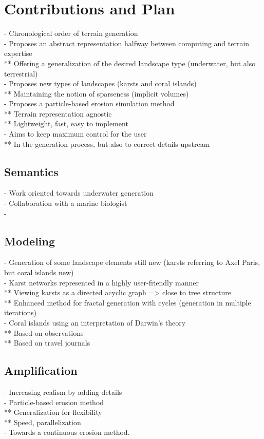 \section{Contributions and Plan}
\label{sec:introduction_contribution-plan}
- Chronological order of terrain generation \\
- Proposes an abstract representation halfway between computing and terrain expertise \\
** Offering a generalization of the desired landscape type (underwater, but also terrestrial) \\
- Proposes new types of landscapes (karsts and coral islands) \\
** Maintaining the notion of sparseness (implicit volumes) \\
- Proposes a particle-based erosion simulation method \\
** Terrain representation agnostic \\
** Lightweight, fast, easy to implement \\
- Aims to keep maximum control for the user \\ 
** In the generation process, but also to correct details upstream

\subsection{Semantics}
- Work oriented towards underwater generation \\
- Collaboration with a marine biologist \\
- 

\subsection{Modeling}
- Generation of some landscape elements still new (karsts referring to Axel Paris, but coral islands new) \\
- Karst networks represented in a highly user-friendly manner \\
** Viewing karsts as a directed acyclic graph => close to tree structure \\
** Enhanced method for fractal generation with cycles (generation in multiple iterations) \\
- Coral islands using an interpretation of Darwin's theory \\
** Based on observations \\
** Based on travel journals

\subsection{Amplification}
- Increasing realism by adding details \\
- Particle-based erosion method \\
** Generalization for flexibility \\
** Speed, parallelization \\
- Towards a continuous erosion method.
